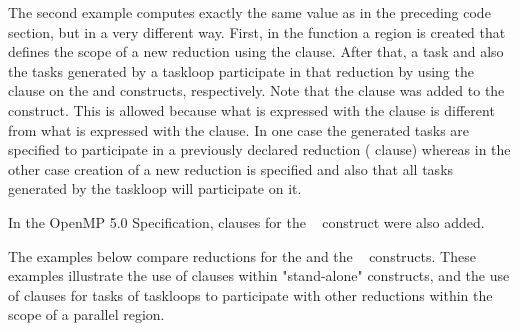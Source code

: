 
The second example computes exactly the same value as in the preceding code section,
but in a very different way.
First, in the  function a  region is created 
that defines the scope of a new reduction using the  clause.
After that, a task and also the tasks generated by a taskloop participate in 
that reduction by using the  clause on the 
and  constructs, respectively. 
Note that the  clause was added to the  construct.
This is allowed because what is expressed with the  clause
is different from what is expressed with the  clause.
In one case the generated tasks are specified to participate in a previously 
declared reduction ( clause) whereas in the other case
creation of a new reduction is specified and also that all tasks generated 
by the taskloop will participate on it.


In the OpenMP 5.0 Specification,  clauses for the
~ construct were also added. 

The examples below compare reductions for the  and the ~ constructs.
These examples illustrate the use of  clauses within 
"stand-alone"  constructs, and the use of  clauses for tasks of taskloops to participate
with other reductions within the scope of a parallel region.

